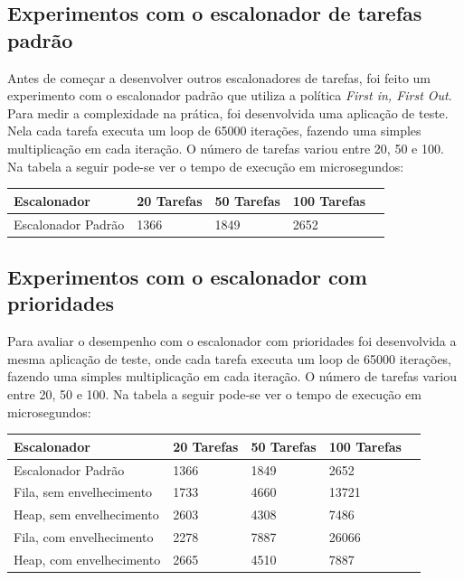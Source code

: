 \documentclass[a4paper, 10pt]{article}
\begin{document}
\subsection{Experimentos com o escalonador de tarefas padrão}
Antes de começar a desenvolver outros escalonadores de tarefas, foi feito um experimento com o escalonador 
padrão que utiliza a política \textit{First in, First Out}.
Para medir a complexidade na prática, foi desenvolvida uma aplicação de teste. Nela cada tarefa executa um loop de 65000
iterações, fazendo uma simples multiplicação em cada iteração. O número de tarefas variou entre 20, 50 e 100.
Na tabela a seguir pode-se ver o tempo de execução em microsegundos:
\begin{center}
    \begin{tabular}{ | l | l | l | l | p{5cm} |}
    \hline
    Escalonador              & 20 Tarefas & 50 Tarefas & 100 Tarefas \\ \hline
    Escalonador Padrão       & 1366 & 1849 & 2652 \\ \hline
    \end{tabular}
\end{center}

\subsection{Experimentos com o escalonador com prioridades}
Para avaliar o desempenho com o escalonador com prioridades foi desenvolvida a mesma aplicação de teste,
onde cada tarefa executa um loop de 65000 iterações, fazendo uma simples multiplicação em cada iteração. 
O número de tarefas variou entre 20, 50 e 100.
Na tabela a seguir pode-se ver o tempo de execução em microsegundos:
\begin{center}
    \begin{tabular}{ | l | l | l | l | p{5cm} |}
    \hline
    Escalonador              & 20 Tarefas & 50 Tarefas & 100 Tarefas \\ \hline
    Escalonador Padrão       & 1366 & 1849 & 2652 \\ \hline 
    Fila, sem envelhecimento & 1733 & 4660 & 13721 \\ \hline 
    Heap, sem envelhecimento & 2603 & 4308 & 7486 \\ \hline
    Fila, com envelhecimento & 2278 & 7887 & 26066 \\ \hline
    Heap, com envelhecimento & 2665 & 4510 & 7887 \\ \hline
    \end{tabular}
\end{center}
\end{document}

